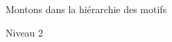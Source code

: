 \documentclass[preview]{standalone}
\begin{document}
\begin{center}
Montons dans la hiérarchie des motifs

    Niveau 2
\end{center}
\end{document}
